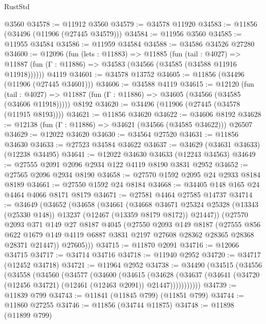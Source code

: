 \begin{lexlean}{RustStd}
\begin{coremodule}
    @3560
@34578 := @11912 @3560
@34579 := @34578 @11920
@34583 := @11856 (@34496 (@11906 (@27445 @34579)))
@34584 := @11956 @3560
@34585 := @11955 @34584
@34586 := @11959 @34584
@34588 := @34586 @34526 @27280
@34600 := @12096
    (fun (lets : @11883) =>
    @11885
      (fun (tail : @4027) =>
      @11887 (fun (Γ : @11886) => @34583 (@34566 (@34585 (@34588 @11916 @11918))))))
    @4119
@34601 := @34578 @13752
@34605 := @11856 (@34496 (@11906 (@27445 @34601)))
@34606 := @34588 @4119
@34615 := @12120
    (fun (tail : @4027) => @11887 (fun (Γ : @11886) => @34605 (@34566 (@34585 (@34606 @11918)))))
    @8192
@34620 := @34496 (@11906 (@27445 (@34578 (@11915 @8193))))
@34621 := @11856 @34620
@34622 := @34606 @8192
@34628 := @12138 (fun (Γ : @11886) => @34621 (@34566 (@34585 @34622))) @26507
@34629 := @12022 @34620
@34630 := @34564 @27520
@34631 := @11856 @34630
@34633 := @27523 @34584 @34622
@34637 := @34629 (@34631 @34633) (@12238 @34495)
@34641 := @12022 @34630 @34633 (@12243 @34563)
@34649 := @27555 @2091 @2096 @2934 @122 @4119 @8190 @3831 @2952
@34652 := @27565 @2096 @2934 @8190
@34658 := @27570 @1592 @2095 @24 @2933 @8184 @8189
@34661 := @27550 @1592 @24 @8184
@34668 := @34405 @148 @165 @24 @4464 @4066 @8171 @8179
@34671 := @27581 @4464 @27585 @14737
@34714 := @34649
    (@34652
      (@34658
        (@34661
          (@34668
            @34671
            @25324
            @25328
            (@13343 (@25330 @148))
            @13237
            (@12467 (@13359 @8179 @8172))
            @21447))
        (@27570
          @2093
          @371
          @149
          @27
          @8187
          @4045
          (@27550
            @2093
            @149
            @8187
            (@27555
              @856
              @622
              @1679
              @149
              @4119
              @6887
              @3831
              @2197
              @27608
              @28362
              @28365
              @28368
              @28371
              @21447))
          @27605)))
@34715 := @11870 @2091
@34716 := @12066 @34715
@34717 := @34714 @34716
@34718 := @11940 @2952
@34720 := @34717 (@12452 @34718)
@34721 := @11964 @2952
@34738 := @34490
    (@34515
      (@34556
        (@34558
          (@34560
            (@34577
              (@34600
                (@34615
                  (@34628
                    (@34637
                      (@34641 (@34720 (@12456 @34721) (@12461 (@12463 @2091)) @21447)))))))))))
@34739 := @11839 @799
@34743 := @11841 (@11845 @799) (@11851 @799)
@34744 := @11860 @27255
@34746 := @11856 (@34744 @11875)
@34748 := @11898 (@11899 @799)

\end{coremodule}
\end{lexlean}
